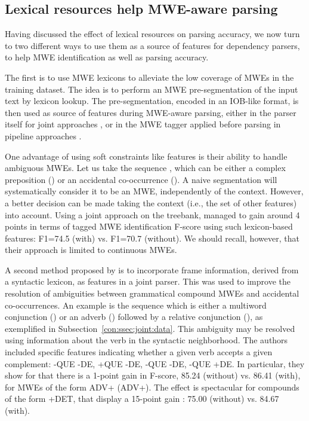 \documentclass[output=paper]{langsci/langscibook}
\begin{document}
\subsection{Lexical resources help MWE-aware parsing}
\label{con:ssec:lex-help-mwe}

Having discussed the effect of lexical resources on parsing accuracy, we now turn to two different ways to use them as a source of features for dependency parsers, to help MWE identification as well as parsing accuracy. 

The first is to use MWE lexicons to alleviate the low coverage of MWEs in the training dataset. The idea is to perform an MWE pre-segmentation of the input text by lexicon lookup. The pre-segmentation, encoded in an IOB-like format, is then used as source of features during MWE-aware parsing, either in the parser itself for joint approaches \citep{candito2014strategies}, or in the MWE tagger applied before parsing in pipeline approaches \citep{constant12acl,constant13mwe}.  

One advantage of using soft constraints like features is their ability to handle ambiguous MWEs.
Let us take the sequence , which can be either a complex preposition () or an accidental co-occurrence (). A naive segmentation will systematically consider it to be an MWE, independently of the context. However, a better decision can be made taking the context (i.e., the set of other features) into account. Using a joint approach on the  treebank, \citet{candito2014strategies} managed to gain around 4 points in terms of tagged MWE identification F-score using such lexicon-based features: F1=74.5 (with) vs. F1=70.7 (without). We should recall, however, that their approach is limited to continuous MWEs.


A second method proposed by \citet{nasretal15} is to incorporate  frame information, derived from a syntactic lexicon, as features in a joint parser. This was used to improve the resolution of ambiguities between grammatical compound MWEs and accidental co-occurrences.
An example is the  sequence  which is either a multiword conjunction () or  an adverb () followed by a relative conjunction (), as exemplified in Subsection~\ref{con:ssec:joint:data}. This ambiguity may be resolved using information about the verb in the syntactic neighborhood. The authors included specific features indicating whether a given verb accepts a given complement:  -QUE -DE,  +QUE -DE,  -QUE -DE,  -QUE +DE. 
In particular, they show for  that there is a 1-point gain in F-score, 85.24 (without) vs. 86.41 (with), for MWEs of the form ADV+ (ADV+). The effect is spectacular for compounds of the form +DET, that display a 15-point gain : 75.00 (without) vs. 84.67 (with).
\end{document}
